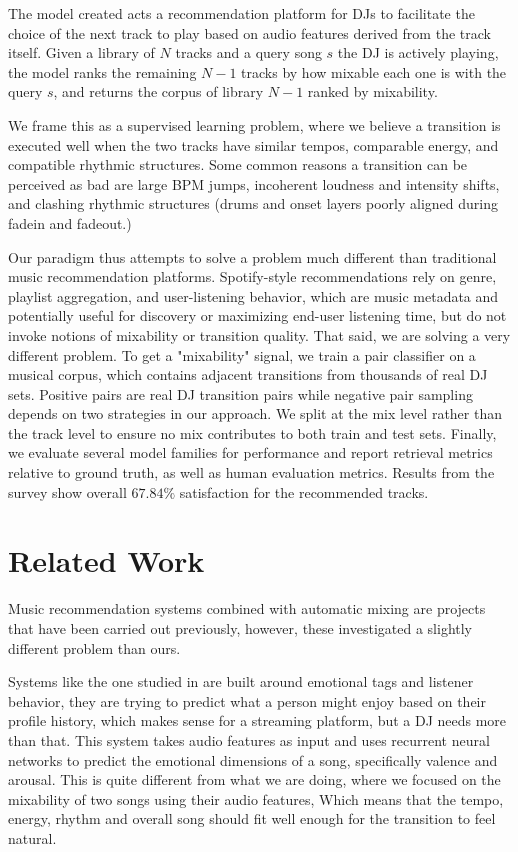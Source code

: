 \documentclass{article}
\begin{document}
The model created acts a recommendation platform for DJs to facilitate the choice of the next track to play based on audio features derived from the track itself. Given a library of $N$ tracks and a query song $s$ the DJ is actively playing, the model ranks the remaining $N - 1$ tracks by how mixable each one is with the query $s$, and returns the corpus of library $N - 1$ ranked by mixability. 

We frame this as a supervised learning problem, where we believe a transition is executed well when the two tracks have similar tempos, comparable energy, and compatible rhythmic structures. Some common reasons a transition can be perceived as bad are large BPM jumps, incoherent loudness and intensity shifts, and clashing rhythmic structures (drums and onset layers poorly aligned during fadein and fadeout.)

Our paradigm thus attempts to solve a problem much different than traditional music recommendation platforms. Spotify-style recommendations rely on genre, playlist aggregation, and user-listening behavior, which are music metadata and potentially useful for discovery or maximizing end-user listening time, but do not invoke notions of mixability or transition quality. That said, we are solving a very different problem. To get a "mixability" signal, we train a pair classifier on a musical corpus, which contains adjacent transitions from thousands of real DJ sets. Positive pairs are real DJ transition pairs while negative pair sampling depends on two strategies in our approach. We split at the mix level rather than the track level to ensure no mix contributes to both train and test sets. Finally, we evaluate several model families for performance and report retrieval metrics relative to ground truth, as well as human evaluation metrics. Results from the survey show overall $67.84 \%$ satisfaction for the recommended tracks.


\section{Related Work}
Music recommendation systems combined with automatic mixing are projects that have been carried out previously, however, these investigated a slightly different problem than ours.

Systems like the one studied in \citep{aljanaki2017benchmark} are built around emotional tags and listener behavior, they are trying to predict what a person might enjoy based on their profile history, which makes sense for a streaming platform, but a DJ needs more than that. This system takes audio features as input and uses recurrent neural networks to predict the emotional dimensions of a song, specifically valence and arousal. This is quite different from what we are doing, where we focused on the mixability of two songs using their audio features, Which means that the tempo, energy, rhythm and overall song should fit well enough for the transition to feel natural. 
\end{document}
